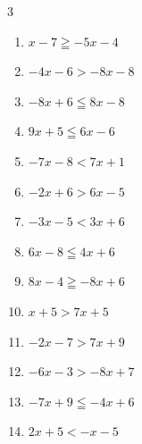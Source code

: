 \begin{multicols}{3}
\begin{enumerate}
  \item $x-7\geqq -5x-4$


  \item $-4x-6>-8x-8$


  \item $-8x+6\leqq 8x-8$


  \item $9x+5\leqq 6x-6$


  \item $-7x-8<7x+1$


\columnbreak %

  \item $-2x+6>6x-5$


  \item $-3x-5<3x+6$


  \item $6x-8\leqq 4x+6$

        \phantom{$\displaystyle x\leqq 7$}

  \item $8x-4\geqq -8x+6$


  \item $x+5>7x+5$

        \phantom{$\displaystyle x<0$}

  \item $-2x-7>7x+9$


  \item $-6x-3>-8x+7$

        \phantom{$\displaystyle x>5$}

  \item $-7x+9\leqq -4x+6$

        \phantom{$\displaystyle x\geqq 1$}

  \item $2x+5<-x-5$


\end{enumerate}
\end{multicols}
